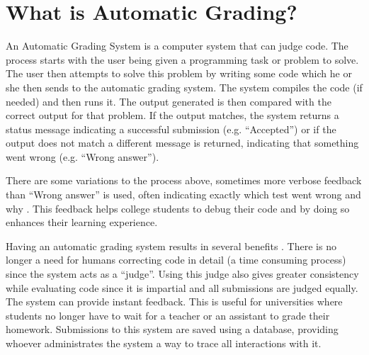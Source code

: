 \section{What is Automatic Grading?}
An Automatic Grading System is a computer system that can judge code. The process starts with the user being given a programming task or problem to solve. The user then attempts to solve this problem by writing some code which he or she then sends to the automatic grading system. The system compiles the code (if needed) and then runs it. The output generated is then compared with the correct output for that problem. If the output matches, the system returns a status message indicating a successful submission (e.g. ``Accepted'') or if the output does not match a different message is returned, indicating that something went wrong (e.g. ``Wrong answer'').

There are some variations to the process above, sometimes more verbose feedback than “Wrong answer” is used, often indicating exactly which test went wrong and why \cite{Gradebot}. This feedback helps college students to debug their code and by doing so enhances their learning experience.

Having an automatic grading system results in several benefits \cite{Suleman}. There is no longer a need for humans correcting code in detail (a time consuming process) since the system acts as a ``judge''. Using this judge also gives greater consistency while evaluating code since it is impartial and all submissions are judged equally. The system can provide instant feedback. This is useful for universities where students no longer have to wait for a teacher or an assistant to grade their homework. Submissions to this system are saved using a database, providing whoever administrates the system a way to trace all interactions with it.



